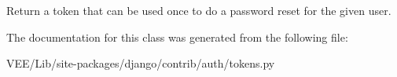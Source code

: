 \begin{DoxyVerb}Return a token that can be used once to do a password reset
for the given user.
\end{DoxyVerb}
 

The documentation for this class was generated from the following file\+:\begin{DoxyCompactItemize}
\item 
V\+E\+E/\+Lib/site-\/packages/django/contrib/auth/tokens.\+py\end{DoxyCompactItemize}

